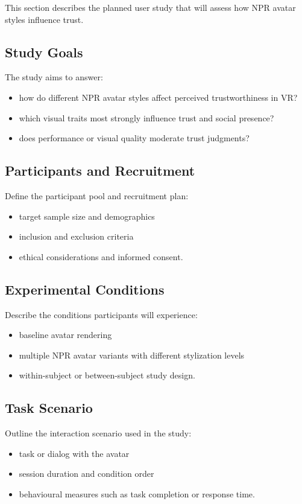 This section describes the planned user study that will assess how NPR avatar styles influence trust.

\subsection{Study Goals}

The study aims to answer:
\begin{itemize}
  \item how do different NPR avatar styles affect perceived trustworthiness in VR?
  \item which visual traits most strongly influence trust and social presence?
  \item does performance or visual quality moderate trust judgments?
\end{itemize}

\subsection{Participants and Recruitment}

Define the participant pool and recruitment plan:
\begin{itemize}
  \item target sample size and demographics
  \item inclusion and exclusion criteria
  \item ethical considerations and informed consent.
\end{itemize}

\subsection{Experimental Conditions}

Describe the conditions participants will experience:
\begin{itemize}
  \item baseline avatar rendering
  \item multiple NPR avatar variants with different stylization levels
  \item within-subject or between-subject study design.
\end{itemize}

\subsection{Task Scenario}

Outline the interaction scenario used in the study:
\begin{itemize}
  \item task or dialog with the avatar
  \item session duration and condition order
  \item behavioural measures such as task completion or response time.
\end{itemize}

